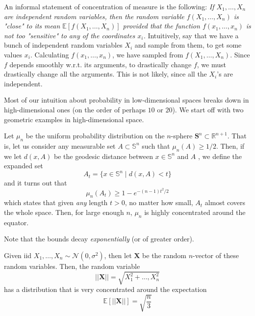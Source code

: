 An informal statement of concentration of measure is the following: \textit{If $X_1, \ldots, X_n$ are independent random variables, then the random variable $f(X_1, \ldots, X_n)$ is "close" to its mean $\mathbb{E}[f(X_1, \ldots, X_n)]$ provided that the function $f(x_1, \ldots, x_n)$ is not too "sensitive" to any of the coordinates $x_i$.} Intuitively, say that we have a bunch of independent random variables $X_i$ and sample from them, to get some values $x_i$. Calculating $f(x_1, \ldots, x_n)$, we have sampled from $f(X_1, \ldots, X_n)$. Since $f$ depends smoothly w.r.t. its arguments, to drastically change $f$, we must drastically change all the arguments. This is not likely, since all the $X_i$'s are independent. 

Most of our intuition about probability in low-dimensional spaces breaks down in high-dimensional ones (on the order of perhaps $10$ or $20$). We start off with two geometric examples in high-dimensional space. 

\begin{example}
Let $\mu_n$ be the uniform probability distribution on the $n$-sphere $\mathbf{S}^{n} \subset \mathbb{R}^{n+1}$. That is, let us consider any measurable set $A \subset \mathbb{S}^{n}$ such that $\mu_n (A) \geq 1/2$. Then, if we let $d(x, A)$ be the geodesic distance between $x \in \mathbb{S}^n$ and $A$ , we define the expanded set 
\[A_t = \{x \in \mathbb{S}^n \mid d(x, A) < t\}\]
and it turns out that 
\[\mu_n (A_t) \geq 1 - e^{- (n -1) t^2 / 2}\]
which states that given \textit{any} length $t > 0$, no matter how small, $A_t$ almost covers the whole space. Then, for large enough $n$, $\mu_n$ is highly concentrated around the equator. 
\end{example}

Note that the bounds decay \textit{exponentially} (or of greater order). 

\begin{example}

\end{example}

\begin{example}
Given iid $X_1, \ldots, X_n \sim \mathcal{N}(0, \sigma^2)$, then let $\mathbf{X}$ be the random $n$-vector of these random variables. Then, the random variable 
\[||\mathbf{X}|| = \sqrt{X_1^2 + \ldots, X_n^2}\]
has a distribution that is very concentrated around the expectation 
\[\mathbb{E}[||\mathbf{X}||] = \sqrt{\frac{n}{3}}\]
\end{example}

